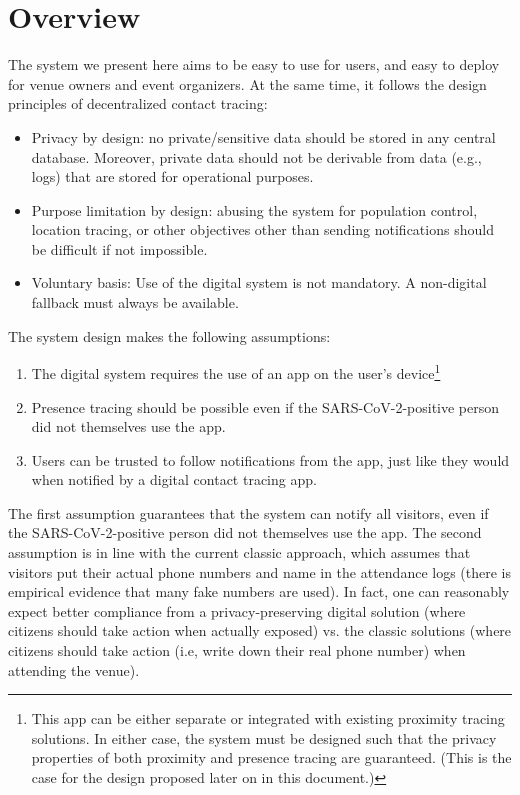 \section{Overview}
The system we present here aims to be easy to use for users, and easy to deploy for venue owners and event organizers. At the same time, it follows the design principles of decentralized contact tracing:

\begin{itemize}
\item Privacy by design: no private/sensitive data should be stored in any central database. Moreover, private data should not be derivable from data (e.g., logs) that are stored for operational purposes.
\item Purpose limitation by design: abusing the system for population control, location tracing, or other objectives other than sending notifications should be difficult if not impossible.
\item Voluntary basis: Use of the digital system is not mandatory. A non-digital fallback must always be available.
\end{itemize}

The system design makes the following assumptions:

\begin{enumerate}
\item The digital system requires the use of an app on the user’s device\footnote{This app can be either separate or integrated with existing proximity tracing solutions. In either case, the system must be designed such that the privacy properties of both proximity and presence tracing  are guaranteed. (This is the case for the design proposed later on in this document.)}
\item Presence tracing should be possible even if the SARS-CoV-2-positive person did not themselves use the app.
\item Users can be trusted to follow notifications from the app, just like they would when notified by a digital contact tracing app.
\end{enumerate}

The first assumption guarantees that the system can notify all visitors, even if the SARS-CoV-2-positive person did not themselves use the app. The second assumption is in line with the current classic approach, which assumes that visitors put their actual phone numbers and name in the attendance logs (there is empirical evidence that many fake numbers are used). In fact, one can reasonably expect better compliance from a privacy-preserving digital solution (where citizens should take action when actually exposed) vs. the classic solutions (where citizens should take action (i.e, write down their real phone number) when attending the venue).

